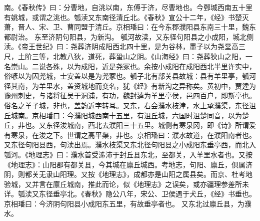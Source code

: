 \documentclass[12pt,UTF8]{ctexbook}
\begin{document}
南。《春秋传》曰：分曹地，自洮以南，东傅于济，尽曹地也。今鄄城西南五十里有姚城，或谓之洮也。瓠渎又东南径清丘北。《春秋》宣公十二年，《经》书楚灭萧，晋人、宋、卫、曹同盟于清丘。京相璠曰：在今东郡濮阳县东南三十里，魏东都尉治。
东至济阴句阳县，为新沟。
瓠河故渎，又东径句阳县之小成阳，城北侧渎。《帝王世纪》曰：尧葬济阴成阳西北四十里，是为谷林，墨子以为尧堂高三尺，土阶三等，北教八狄，道死，葬蛩山之阴。《山海经》曰：尧葬狄山之阳，一名崇山。二说各殊，以为成阳，近是尧冢也。余按小成阳在成阳西北半里许实中，俗喭以为囚尧城，士安盖以是为尧冢也。瓠子北有部关县故城：县有羊里亭，瓠河径其南，为羊里水，盖资城地而变名，犹《经》有新沟之异称矣。黄初中，贾逵为豫州刺史，与诸将征吴于洞浦，有功，魏封逵为羊里亭侯，邑四百户，即斯亭也。俗名之羊子城，非也，盖韵近字转耳。又东，右会濮水枝津，水上承濮渠，东径沮丘城南。京相璠曰：今濮阳城西南十五里，有沮丘城，六国时沮楚同音，以为楚丘，非也。又东径浚城南，西北去濮阳三十五里。城侧有寒泉冈，即《诗》所谓爱有寒泉，在浚之下。世谓之高平渠，非也。京相璠曰：濮水故道，在濮阳南者也。又东径句阳县西，句渎出焉。濮水枝渠又东北径句阳县之小成阳东垂亭西，而北入瓠河。《地理志》曰：濮水首受泲沛于封丘县东北，至都关，入羊里水者也。又按《地理志》：山阳郡有都关县，今其城在廪丘城西。考地志，句阳、廪丘，俱属济阴，则都关无隶山阳理。又按《地理志》，成都亦是山阳之属县矣。而京、杜考地验城，又并言在廪丘城南，推此而论，似《地理志》之误矣，或亦疆理参差所未详。瓠渎又东径垂亭北。《春秋》隐公八年，宋公、卫侯遇于犬丘，《经》书垂也。京相璠曰：今济阴句阳县小成阳东五里，有故垂亭者也。
又东北过廪丘县，为濮水。
\end{document}
